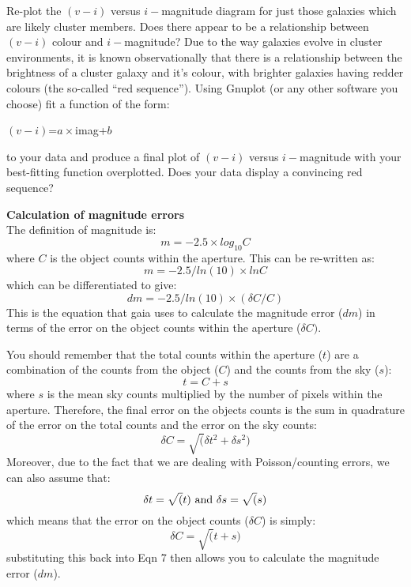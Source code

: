 Re-plot the $(v-i)$ versus $i-$magnitude diagram for just those galaxies which
are likely cluster members. Does there appear to be a relationship
between $(v-i)$ colour and $i-$magnitude? Due to the way galaxies
evolve in cluster environments, it is known observationally
that there is a relationship between the brightness of a cluster
galaxy and it's colour, with brighter galaxies having redder colours
(the so-called ``red sequence''). Using Gnuplot (or any other software you choose) fit a
function of the form:\\
\begin{center}
$(v-i)$=$a\times$imag+$b$ 
\end{center}
\noindent
to your data and produce a final plot of $(v-i)$ versus $i-$magnitude with your
best-fitting function overplotted. Does your data display a convincing
red sequence?

\newpage

{\large{\bf Calculation of magnitude errors}}\\

The definition of magnitude is:
\begin{equation}
m = -2.5\times log_{10} C
\end{equation}
\noindent
where $C$ is the object counts within the aperture. This can be re-written as:
\begin{equation}
m = -2.5/ln(10) \times ln C
\end{equation}
\noindent
which can be differentiated to give:
\begin{equation}
dm = -2.5/ln(10) \times (\delta C/C)
\end{equation}
\noindent
This is the equation that {\sc gaia} uses to calculate the magnitude
error ($dm$) in terms of the error on the object counts within the
aperture ($\delta C)$.

You should remember that the total counts within the aperture ($t$)
are a combination of the counts from the object ($C$) and the counts from the
sky ($s$):
\begin{equation}
t= C + s 
\end{equation}
\noindent
where $s$ is the mean sky counts multiplied by the number of pixels
within the aperture. Therefore, the final error on the objects counts
is the sum in quadrature of the error on the total counts and the
error on the sky counts:
\begin{equation}
\delta C = \sqrt( \delta t^2 + \delta s^2 )
\end{equation}
Moreover, due to the fact that we are dealing with Poisson/counting
errors, we can also assume that:
\begin{equation}
\delta t = \sqrt(t)\,\, {\rm and}\,\, \delta s = \sqrt(s)
\end{equation}
\noindent
which means that the error on the object counts ($\delta C$) is
simply:
\begin{equation}
\delta C = \sqrt(t+s)
\end{equation}
\noindent
substituting this back into Eqn 7 then allows you to calculate the
magnitude error ($dm$).
